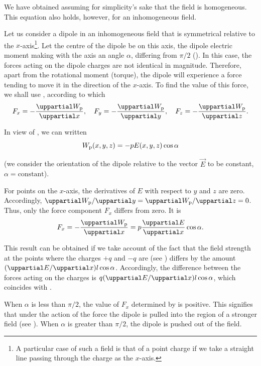 We have obtained  assuming for simplicity's sake that the field is homogeneous. This equation also holds, however, for an inhomogeneous field.

Let us consider a dipole in an inhomogeneous field that is symmetrical relative to the $x$-axis\footnote{A particular case of such a field is that of a point charge if we take a straight line passing through the charge as the $x$-axis.}. Let the centre of the dipole be on this axis, the dipole electric moment making with the axis an angle $\alpha$, differing from $\pi/2$ (). In this case, the forces acting on the dipole charges are not identical in magnitude. Therefore, apart from
the rotational moment (torque), the dipole will experience a force tending to move it in the direction of the $x$-axis. To find the value of this force, we shall use , according to which
\begin{equation*}
	F_x = -\diffpartial{\ab{W}{p}}{x},\quad F_y = -\diffpartial{\ab{W}{p}}{y},\quad F_z = -\diffpartial{\ab{W}{p}}{z}.
\end{equation*}

\noindent
In view of , we can written
\begin{equation*}
	W_{\text{p}}(x,y,z) = -p E(x,y,z)\cos\alpha
\end{equation*}

\noindent
(we consider the orientation of the dipole relative to the vector $\vec{E}$ to be constant, $\alpha=\text{constant}$).

For points on the $x$-axis, the derivatives of $E$ with respect to $y$ and $z$ are zero. Accordingly, $\diffinpartial{\ab{W}{p}}{y}=\diffinpartial{\ab{W}{p}}{z}=0$. Thus, only
the force component $F_x$ differs from zero. It is
\begin{equation}\label{eq:1_62}
	F_x = - \diffpartial{\ab{W}{p}}{x} = p \diffpartial{E}{x} \cos\alpha.
\end{equation}

\noindent
This result can be obtained if we take account of the fact that the field strength at the points where the charges $+q$ and $-q$ are (see
) differs by the amount $(\diffinpartial{E}{x})l\cos\alpha$. Accordingly, the difference between the forces acting on the charges is $q(\diffinpartial{E}{x})l\cos\alpha$, which coincides with .

When $\alpha$ is less than $\pi/2$, the value of $F_x$ determined by  is positive. This signifies that under the action of the force the dipole is pulled into the region of a stronger field (see ). When $\alpha$ is greater than $\pi/2$, the dipole is pushed out of the field.

